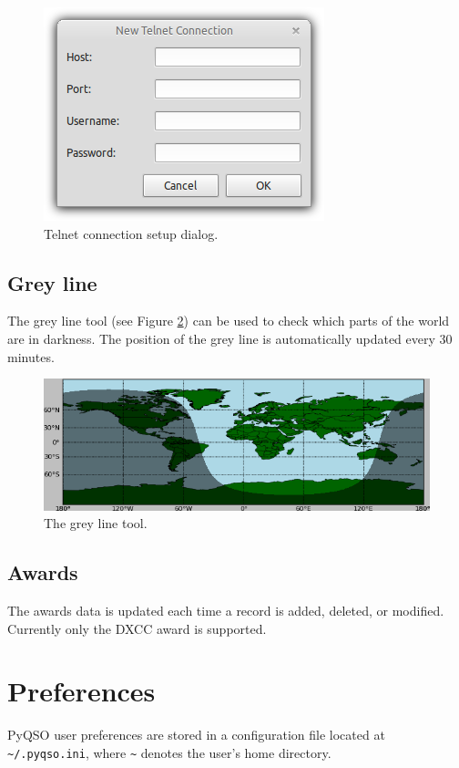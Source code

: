 \documentclass[11pt, a4paper]{report}
\begin{document}
\begin{figure}
  \centering
  \includegraphics[width=0.5\columnwidth]{images/telnet_connection_dialog.png}
  \caption{Telnet connection setup dialog.}
  \label{fig:telnet_connection_dialog}
\end{figure}

\section{Grey line}
The grey line tool (see Figure \ref{fig:grey_line}) can be used to check which parts of the world are in darkness. The position of the grey line is automatically updated every 30 minutes.

\begin{figure}
  \centering
  \includegraphics[width=1\columnwidth]{images/grey_line.png}
  \caption{The grey line tool.}
  \label{fig:grey_line}
\end{figure}

\section{Awards}
The awards data is updated each time a record is added, deleted, or modified. Currently only the DXCC award is supported.

\chapter{Preferences}\label{chap:preferences}
PyQSO user preferences are stored in a configuration file located at \texttt{\textasciitilde/.pyqso.ini}, where \texttt{\textasciitilde} denotes the user's home directory.
\end{document}

